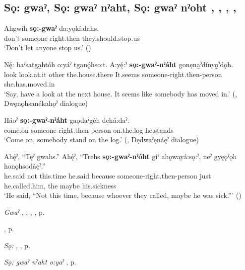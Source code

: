 \subsection*{\textbf{Sǫ: gwaˀ, Sǫ: gwaˀ nˀaht, Sǫ: gwaˀ nˀoht} , , , , } \label{p:sǫ: gwaˀ, sǫ: gwaˀ nˀaht]}

\ea
\label{ex:spart70}
\gll Ahgwíh \textbf{sǫ:-gwaˀ} da:yǫkí:dahs.\\
don’t someone-right.then they.should.stop.us\\
\glt ‘Don’t let anyone stop us.’ (\cite{carrier_legends_2013})
\z

\ea
\label{ex:spart71}
\gll Nę́: haˀsatga̱htóh o:yáˀ tganǫ́hso:t. A:yę́:ˀ \textbf{sǫ:-gwaˀ-nˀáht} gonęna̱ˀdínyǫ̱ˀdǫh.\\
look look.at.it other the.house.there It.seems someone-right.then-person she.has.moved.in\\
\glt ‘Say, have a look at the next house. It seems like somebody has moved in.’ (\cite[441]{mithun_watewayestanih_1984}, Dwęnǫhsanékahǫˀ dialogue)
\z

\ea
\label{ex:spart72}
\gll Háoˀ \textbf{sǫ:-gwaˀ-nˀáht} gaǫda̱ˀgéh de̱há:daˀ.\\
come.on someone-right.then-person on.the.log he.stands\\
\glt ‘Come on, somebody stand on the log.’ (\cite[481]{mithun_watewayestanih_1984}, Dędwaˀęnáęˀ dialogue)
\z

\ea
\label{ex:spart73}
\gll Ahę́ˀ, “Tęˀ gwahs.” Ahę́ˀ, “Trehs \textbf{sǫ:-gwaˀ-nˀóht} giˀ ahǫwayá:sǫ:ˀ, neˀ gyęǫˀǫh honǫhsodáęˀ.”\\
he.said not this.time he.said because someone-right.then-person just he.called.him, the maybe his.sickness\\
\glt ‘He said, “Not this time, because whoever they called, maybe he was sick.”’ (\cite{henry_de_2005})
\z

\begin{CayugaRelated}
\item \textit{Gwaˀ} , , , , p. \pageref{p:[gwaˀ] ‘immediately’}\\
\item {} , p. \pageref{p:[-nˀaht, -noht]}\\
\item \textit{Sǫ:} , , p. \pageref{p:[sǫ:]}\\
\item \textit{Sǫ: gwaˀ nˀaht o:yaˀ} , p. \pageref{p:[sǫ: gwaˀ nˀaht o:yaˀ]}
\end{CayugaRelated}


